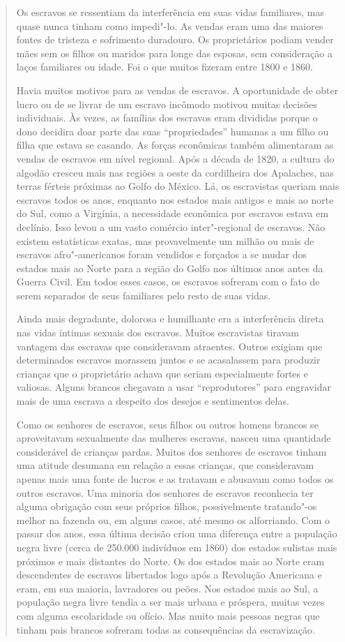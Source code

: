 \begin{quote}
Os escravos se ressentiam da interferência em suas vidas
familiares, mas quase nunca tinham como impedi"-lo. As vendas eram uma
das maiores fontes de tristeza e sofrimento duradouro. Os proprietários
podiam vender mães sem os filhos ou maridos para longe das esposas, sem
consideração a laços familiares ou idade. Foi o que muitos fizeram entre
1800 e 1860.

Havia muitos motivos para as vendas de escravos. A oportunidade de
obter lucro ou de se livrar de um escravo incômodo motivou muitas
decisões individuais. Às vezes, as famílias dos escravos eram divididas
porque o dono decidira doar parte das suas ``propriedades'' humanas a um
filho ou filha que estava se casando. As forças econômicas também
alimentaram as vendas de escravos em nível regional. Após a década de
1820, a cultura do algodão cresceu mais nas regiões a oeste da
cordilheira dos Apalaches, nas terras férteis próximas ao Golfo do
México. Lá, os escravistas queriam mais escravos todos os anos, enquanto
nos estados mais antigos e mais ao norte do Sul, como a Virgínia, a
necessidade econômica por escravos estava em declínio. Isso levou a um
vasto comércio inter"-regional de escravos. Não existem estatísticas
exatas, mas provavelmente um milhão ou mais de escravos afro"-americanos
foram vendidos e forçados a se mudar dos estados mais ao Norte para a
região do Golfo nos últimos anos antes da Guerra Civil. Em todos esses
casos, os escravos sofreram com o fato de serem separados de seus
familiares pelo resto de suas vidas.

Ainda mais degradante, dolorosa e humilhante era a interferência
direta nas vidas íntimas sexuais dos escravos. Muitos escravistas
tiravam vantagem das escravas que consideravam atraentes. Outros exigiam
que determinados escravos morassem juntos e se acasalassem para produzir
crianças que o proprietário achava que seriam especialmente fortes e
valiosas. Alguns brancos chegavam a usar ``reprodutores'' para
engravidar mais de uma escrava a despeito dos desejos e sentimentos
delas.

Como os senhores de escravos, seus filhos ou outros homens brancos
se aproveitavam sexualmente das mulheres escravas, nasceu uma quantidade
considerável de crianças pardas. Muitos dos senhores de escravos tinham
uma atitude desumana em relação a essas crianças, que consideravam
apenas mais uma fonte de lucros e as tratavam e abusavam como todos os
outros escravos. Uma minoria dos senhores de escravos reconhecia ter
alguma obrigação com seus próprios filhos, possivelmente tratando"-os
melhor na fazenda ou, em alguns casos, até mesmo os alforriando. Com o
passar dos anos, essa última decisão criou uma diferença entre a
população negra livre (cerca de 250.000 indivíduos em 1860) dos estados
sulistas mais próximos e mais distantes do Norte. Os dos estados mais ao
Norte eram descendentes de escravos libertados logo após a Revolução
Americana e eram, em sua maioria, lavradores ou peões. Nos estados mais
ao Sul, a população negra livre tendia a ser mais urbana e próspera,
muitas vezes com alguma escolaridade ou ofício. Mas muito mais pessoas
negras que tinham pais brancos sofreram todas as consequências da
escravização.
\end{quote}

